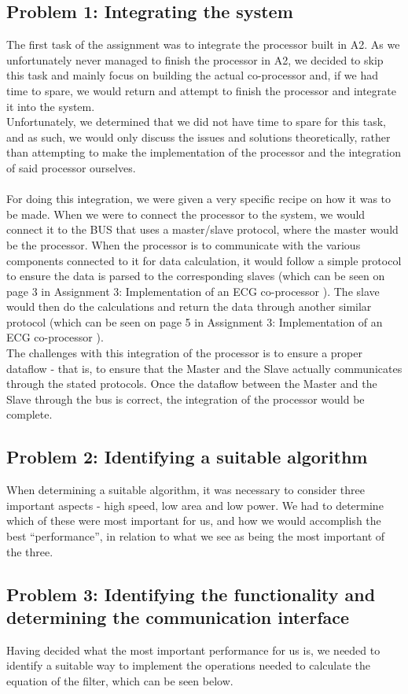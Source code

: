 \documentclass[12pt,a4paper]{article}
\begin{document}
\subsection{Problem 1: Integrating the system}
	The first task of the assignment was to integrate the processor built in A2. As we unfortunately never managed to finish the processor in A2, we decided to skip this task and mainly focus on building the actual co-processor and, if we had time to spare, we would return and attempt to finish the processor and integrate it into the system.\\
	Unfortunately, we determined that we did not have time to spare for this task, and as such, we would only discuss the issues and solutions theoretically, rather than attempting to make the implementation of the processor and the integration of said processor ourselves.\\
	\\
	For doing this integration, we were given a very specific recipe on how it was to be made. When we were to connect the processor to the system, we would connect it to the BUS that uses a master/slave protocol, where the master would be the processor. When the processor is to communicate with the various components connected to it for data calculation, it would follow a simple protocol to ensure the data is parsed to the corresponding slaves (which can be seen on page 3 in Assignment 3: Implementation of an ECG co-processor \cite{lamport94}). The slave would then do the calculations and return the data through another similar protocol (which can be seen on page 5 in Assignment 3: Implementation of an ECG co-processor \cite{lamport94}).\\
	The challenges with this integration of the processor is to ensure a proper dataflow - that is, to ensure that the Master and the Slave actually communicates through the stated protocols. Once the dataflow between the Master and the Slave through the bus is correct, the integration of the processor would be complete.
\subsection{Problem 2: Identifying a suitable algorithm}
	When determining a suitable algorithm, it was necessary to consider three important aspects - high speed, low area and low power. We had to determine which of these were most important for us, and how we would accomplish the best ``performance'', in relation to what we see as being the most important of the three.
\subsection{Problem 3: Identifying the functionality and determining the communication interface}
	Having decided what the most important performance for us is, we needed to identify a suitable way to implement the operations needed to calculate the equation of the filter, which can be seen below.\\
	
\end{document}
